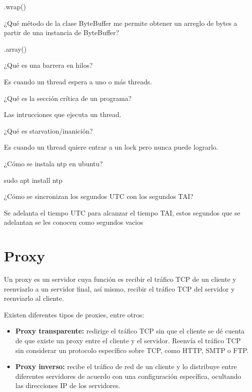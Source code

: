 \documentclass[11pt,a4paper,oneside]{book}
\begin{document}
.wrap()

\begin{SourceCode}
¿Qué método de la clase ByteBuffer me permite obtener un arreglo de bytes a partir de una instancia de ByteBuffer?
\end{SourceCode}

.array()

\begin{SourceCode}
¿Qué es una barrera en hilos?
\end{SourceCode}

Es cuando un thread espera a uno o más threads.

\begin{SourceCode}
¿Qué es la sección crítica de un programa?
\end{SourceCode}

Las intrucciones que ejecuta un thread.

\begin{SourceCode}
¿Qué es starvation/inanición?
\end{SourceCode}

Es cuando un thread quiere entrar a un lock pero nunca puede lograrlo.

\begin{SourceCode}
¿Cómo se instala ntp en ubuntu?
\end{SourceCode}

sudo apt install ntp

\begin{SourceCode}
¿Cómo se sincronizan los segundos UTC con los segundos TAI?
\end{SourceCode}

Se adelanta el tiempo UTC para alcanzar el tiempo TAI, estos segundos que se adelantan se les conocen como segundos vacios

\chapter{Proxy}

Un proxy es un servidor cuya función es recibir el tráfico TCP de un cliente y reenviarlo a un servidor final, así mismo, recibir el tráfico TCP del servidor y reenviarlo al cliente.

Existen diferentes tipos de proxies, entre otros:

\begin{itemize}

\item \textbf{Proxy transparente:} redirige el tráfico TCP sin que el cliente se dé cuenta de que existe un proxy entre el cliente y el servidor. Reenvía el tráfico TCP sin considerar un protocolo específico sobre TCP, como HTTP, SMTP o FTP.

\item \textbf{Proxy inverso:} recibe el tráfico de red de un cliente y lo distribuye entre diferentes servidores de acuerdo con una configuración específica, ocultando las direcciones IP de los servidores.

\end{itemize}
\end{document}
